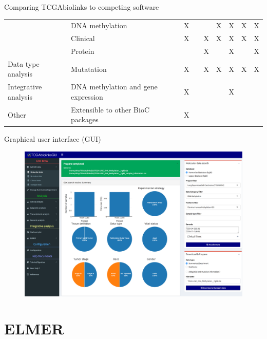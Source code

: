 \documentclass[slidestop,compress,11pt,xcolor=dvipsnames]{beamer}
\begin{document}
\begin{frame}{Comparing TCGAbiolinks to competing software}
\begin{table}
\begin{tabular}{p{3cm}p{3cm}|l|l|l|l|c|l|c|}
\multicolumn{1}{|l|}{} & DNA methylation & X &  &  & X & X & X & X \\ \cline{2-9}
\multicolumn{1}{|l|}{} & Clinical & X &  & X & X & X & X & X \\ \cline{2-9}
\multicolumn{1}{|l|}{} & Protein &  &  & X &  & X &  & X \\ \cline{2-9}
\multicolumn{1}{|l|}{\multirow{-7}{*}{Data type analysis}} & Mutatation & X &  & X & X & X & X & X \\ \hline
\multicolumn{1}{|l|}{Integrative analysis} & DNA methylation and gene expression & X &  &  &  & X &  &  \\ \hline
\multicolumn{1}{|l|}{Other} & Extensible to other BioC packages & X &  &  &  &  &  &  \\ \hline
\end{tabular}
\end{table}
\end{frame}


\begin{frame}{Graphical user interface (GUI)}
 \vspace*{-0.5cm}
 \begin{figure}
  \centering
  \includegraphics[width=1.0\linewidth]{TCGAbiolinks/GUI.png}
 \end{figure}
\end{frame}


\section{ELMER}
\end{document}
